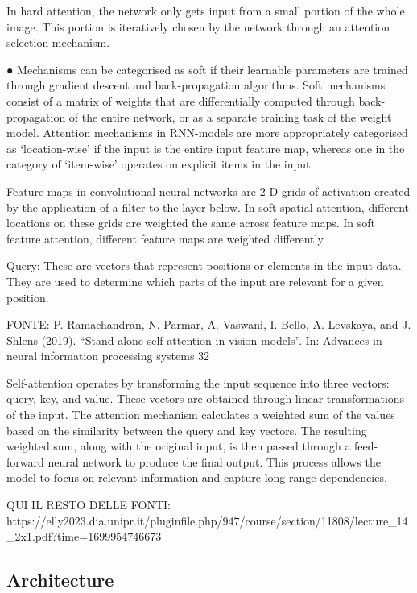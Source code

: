In hard attention, the network only
gets input from a small portion of the
whole image. This portion is iteratively
chosen by the network through an
attention selection mechanism.

● Mechanisms can be categorised as soft if their learnable parameters are
trained through gradient descent and back-propagation algorithms.
Soft mechanisms consist of a matrix of weights that are differentially
computed through back-propagation of the entire network, or as a
separate training task of the weight model.
Attention mechanisms in RNN-models are more appropriately categorised
as ‘location-wise’ if the input is the entire input feature map, whereas one
in the category of ‘item-wise’ operates on explicit items in the input.

Feature maps in convolutional neural
networks are 2-D grids of activation
created by the application of a filter to
the layer below. In soft spatial
attention, different locations on these
grids are weighted the same across
feature maps.
In soft feature attention, different
feature maps are weighted differently

Query: These are vectors that represent positions or elements in the input
data. They are used to determine which parts of the input are relevant for a
given position.

FONTE: 
P. Ramachandran, N. Parmar, A. Vaswani, I. Bello, A. Levskaya, and J. Shlens (2019). “Stand-alone self-attention in vision models”. In:
Advances in neural information processing systems 32

Self-attention operates by transforming the input sequence into three vectors:
query, key, and value.
These vectors are obtained through linear transformations of the input. The
attention mechanism calculates a weighted sum of the values based on the
similarity between the query and key vectors.
The resulting weighted sum, along with the original input, is then passed
through a feed-forward neural network to produce the final output.
This process allows the model to focus on relevant information and capture
long-range dependencies.


QUI IL RESTO DELLE FONTI:
https://elly2023.dia.unipr.it/pluginfile.php/947/course/section/11808/lecture_14_2x1.pdf?time=1699954746673


\subsection{Architecture}

